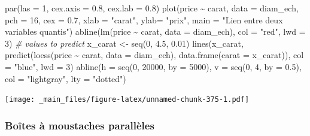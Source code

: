 \documentclass[
]{book}
\newenvironment{Shaded}{\begin{snugshade}}{\end{snugshade}}
\newcommand{\AttributeTok}[1]{\textcolor[rgb]{0.77,0.63,0.00}{#1}}
\newcommand{\CommentTok}[1]{\textcolor[rgb]{0.56,0.35,0.01}{\textit{#1}}}
\newcommand{\DecValTok}[1]{\textcolor[rgb]{0.00,0.00,0.81}{#1}}
\newcommand{\FloatTok}[1]{\textcolor[rgb]{0.00,0.00,0.81}{#1}}
\newcommand{\FunctionTok}[1]{\textcolor[rgb]{0.00,0.00,0.00}{#1}}
\newcommand{\NormalTok}[1]{#1}
\newcommand{\OtherTok}[1]{\textcolor[rgb]{0.56,0.35,0.01}{#1}}
\newcommand{\SpecialCharTok}[1]{\textcolor[rgb]{0.00,0.00,0.00}{#1}}
\newcommand{\StringTok}[1]{\textcolor[rgb]{0.31,0.60,0.02}{#1}}
\theoremstyle{definition}
\theoremstyle{definition}
\theoremstyle{definition}
\theoremstyle{definition}
\theoremstyle{remark}
\begin{document}
\begin{Shaded}
\begin{Highlighting}[]
\FunctionTok{par}\NormalTok{(}\AttributeTok{las =} \DecValTok{1}\NormalTok{, }\AttributeTok{cex.axis =} \FloatTok{0.8}\NormalTok{, }\AttributeTok{cex.lab =} \FloatTok{0.8}\NormalTok{)}
\FunctionTok{plot}\NormalTok{(price }\SpecialCharTok{\textasciitilde{}}\NormalTok{ carat, }\AttributeTok{data =}\NormalTok{ diam\_ech, }\AttributeTok{pch =} \DecValTok{16}\NormalTok{, }\AttributeTok{cex =} \FloatTok{0.7}\NormalTok{, }
     \AttributeTok{xlab =} \StringTok{"carat"}\NormalTok{, }\AttributeTok{ylab=} \StringTok{"prix"}\NormalTok{, }\AttributeTok{main =} \StringTok{"Lien entre deux variables quantis"}\NormalTok{)}
\FunctionTok{abline}\NormalTok{(}\FunctionTok{lm}\NormalTok{(price }\SpecialCharTok{\textasciitilde{}}\NormalTok{ carat, }\AttributeTok{data =}\NormalTok{ diam\_ech), }\AttributeTok{col =} \StringTok{"red"}\NormalTok{, }\AttributeTok{lwd =} \DecValTok{3}\NormalTok{)}
\CommentTok{\# values to predict}
\NormalTok{x\_carat }\OtherTok{\textless{}{-}} \FunctionTok{seq}\NormalTok{(}\DecValTok{0}\NormalTok{, }\FloatTok{4.5}\NormalTok{, }\FloatTok{0.01}\NormalTok{)}
\FunctionTok{lines}\NormalTok{(x\_carat,  }
      \FunctionTok{predict}\NormalTok{(}\FunctionTok{loess}\NormalTok{(price }\SpecialCharTok{\textasciitilde{}}\NormalTok{ carat, }\AttributeTok{data =}\NormalTok{ diam\_ech), }
              \FunctionTok{data.frame}\NormalTok{(}\AttributeTok{carat =}\NormalTok{ x\_carat)), }
      \AttributeTok{col =} \StringTok{"blue"}\NormalTok{, }\AttributeTok{lwd =} \DecValTok{3}\NormalTok{)}
\FunctionTok{abline}\NormalTok{(}\AttributeTok{h =} \FunctionTok{seq}\NormalTok{(}\DecValTok{0}\NormalTok{, }\DecValTok{20000}\NormalTok{, }\AttributeTok{by =} \DecValTok{5000}\NormalTok{), }
       \AttributeTok{v =} \FunctionTok{seq}\NormalTok{(}\DecValTok{0}\NormalTok{, }\DecValTok{4}\NormalTok{, }\AttributeTok{by =} \FloatTok{0.5}\NormalTok{), }
       \AttributeTok{col =} \StringTok{"lightgray"}\NormalTok{, }\AttributeTok{lty =} \StringTok{"dotted"}\NormalTok{)}
\end{Highlighting}
\end{Shaded}

\texttt{[image: \_main\_files/figure-latex/unnamed-chunk-375-1.pdf]}

\hypertarget{bouxeetes-uxe0-moustaches-paralluxe8les}{%
\subsubsection{Boîtes à moustaches parallèles}\label{bouxeetes-uxe0-moustaches-paralluxe8les}}
\end{document}
